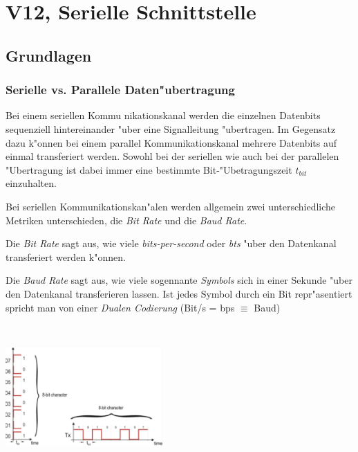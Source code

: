 \section{V12, Serielle Schnittstelle}
\subsection{Grundlagen}
\subsubsection{Serielle vs. Parallele Daten"ubertragung}
\begin{minipage}{12cm}
	Bei einem seriellen Kommu nikationskanal werden die einzelnen Datenbits sequenziell hintereinander "uber eine Signalleitung "ubertragen. Im Gegensatz dazu k"onnen bei einem parallel Kommunikationskanal mehrere Datenbits auf einmal transferiert werden. Sowohl bei der seriellen wie auch bei der parallelen "Ubertragung ist dabei immer eine bestimmte Bit-"Ubetragungszeit $t_{bit}$ einzuhalten.
	
	Bei seriellen Kommunikationskan"alen werden allgemein zwei unterschiedliche Metriken unterschieden, die \textit{Bit Rate} und die \textit{Baud Rate}.
	
	Die \textit{Bit Rate} sagt aus, wie viele \textit{bits-per-second} oder \textit{bts} "uber den Datenkanal transferiert werden k"onnen.
	
	Die \textit{Baud Rate} sagt aus, wie viele sogennante \textit{Symbols} sich in einer Sekunde "uber den Datenkanal transferieren lassen. Ist jedes Symbol durch ein Bit repr"asentiert spricht man von einer \textit{Dualen Codierung} (Bit/s = bps $\equiv$ Baud)
\end{minipage}
%
\begin{minipage}{0.5cm}
	\-\
\end{minipage}
%
\begin{minipage}{6cm}
	\includegraphics[width=6cm]{images/serielle-parallel_grundlagen}
\end{minipage}

